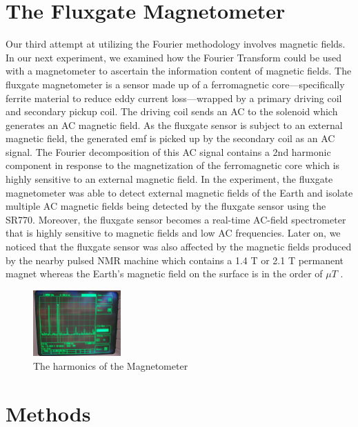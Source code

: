 \documentclass[prl,twocolumn,superscriptaddress,floatfix]{revtex4}
\begin{document}
\section{The Fluxgate Magnetometer}

Our third attempt at utilizing the Fourier methodology involves magnetic fields. 
In our next experiment, we examined how the Fourier Transform could be used with a magnetometer to ascertain the information content of magnetic fields.
The fluxgate magnetometer is a sensor made up of a ferromagnetic core---specifically ferrite material to reduce eddy current loss---wrapped by a primary driving coil and secondary pickup coil. The driving coil sends an AC to the solenoid which generates an AC magnetic field. As the fluxgate sensor is subject to an external magnetic field, the generated emf is picked up by the secondary coil as an AC signal. The Fourier decomposition of this AC signal contains a 2nd harmonic component in response to the magnetization of the ferromagnetic core which is highly sensitive to an external magnetic field.
In the experiment, the fluxgate magnetometer was able to detect external magnetic fields of the Earth and isolate multiple AC magnetic fields being detected by the fluxgate sensor using the SR770. Moreover, the fluxgate sensor becomes a real-time AC-field spectrometer that is highly sensitive to magnetic fields and low AC frequencies.
Later on, we noticed that the fluxgate sensor was also affected by the magnetic fields produced by the nearby pulsed NMR machine which contains a 1.4 T or 2.1 T permanent magnet whereas the Earth's magnetic field on the surface is in the order of $\mu T$ \cite{Cornell2000}.

\begin{figure}[H]
    \centering
    \includegraphics[width=0.3\textwidth]{Magnetometer Data.jpg}
    \caption{The harmonics of the Magnetometer}
    \label{fig:enter-label}
\end{figure}

\section{Methods}
\end{document}

